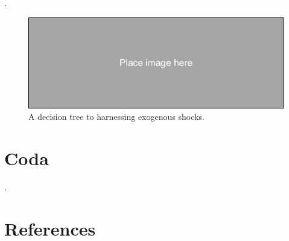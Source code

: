 \begin{refsection}
.



\begin{figure}[!htbp]
  \includegraphics[width=1\textwidth]{exhibits/place_holder.pdf}
  \caption{A decision tree to harnessing exogenous shocks.}
  \label{fig:harnessing_exogeneous_shocks}
\end{figure}

\section{Coda}
\label{sec:coda}
.

\clearpage

%
\section*{References}
\printbibliography[heading=none]
\end{refsection}

%
%
%
%
%
%


